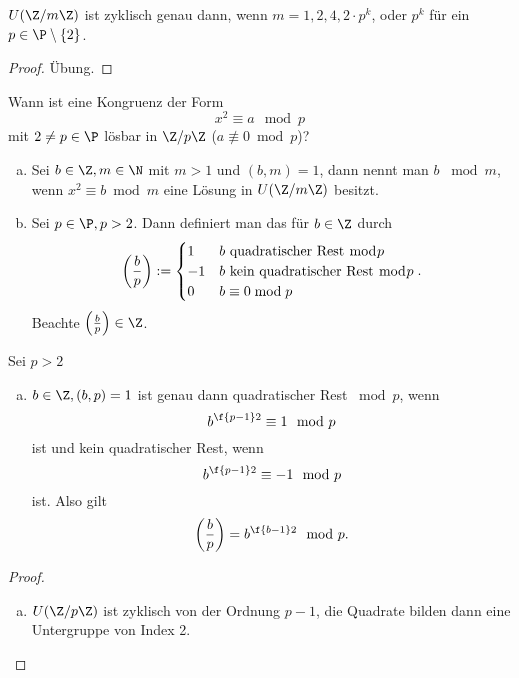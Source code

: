 \begin{kor} \label{2.12}
	$U(\Z / m\Z)$ ist zyklisch genau dann, wenn $m = 1, 2, 4, 2 \cdot p^k$, oder $p^k$ für ein $p \in \P \setminus \{2\}$.
	\begin{proof}
		Übung.
		\Exercise
	\end{proof}
\end{kor}

Wann ist eine Kongruenz der Form
\[
	x^2 \equiv a \mod p
\]
mit $2 \neq p \in \P$ lösbar in $\Z / p\Z$ ($a \not\equiv 0 \bmod p$)?

\begin{df} \label{2.13}
	\begin{enumerate}[a)]
		\item
		Sei $b \in \Z, m \in \N$ mit $m > 1$ und $(b, m) = 1$, dann nennt man $b$  $\bmod m$, wenn $x^2 \equiv b \bmod m$ eine Lösung in $U(\Z / m\Z)$ besitzt.
		\item
			Sei $p \in \P, p > 2$.
			Dann definiert man das  für $b \in \Z$ durch
			\[
				\left( \frac{b}{p} \right) := \begin{cases}
					1 & \text{$b$ quadratischer Rest $\bmod p$} \\
					-1 & \text{$b$ kein quadratischer Rest $\bmod p$} \\
					0 & \text{$b \equiv 0 \bmod p$}
				\end{cases}.
			\]
			Beachte $\legsym bp \in \Z$.
	\end{enumerate}
\end{df}

\begin{lem}
	Sei $p > 2$
	\begin{enumerate}[a)]
		\item
			$b \in \Z, (b, p) = 1$ ist genau dann quadratischer Rest $\bmod p$, wenn
			\[
				b^{\f {p-1}2} \equiv 1 \mod p
			\]
			ist und kein quadratischer Rest, wenn
			\[
				b^{\f {p-1}2} \equiv -1 \mod p
			\]
			ist.
			Also gilt
			\[
				\legsym bp = b^{\f {b-1}2} \mod p.
			\]
	\end{enumerate}
	\begin{proof}
		\begin{enumerate}[a)]
			\item
				$U(\Z / p\Z)$ ist zyklisch von der Ordnung $p - 1$, die Quadrate bilden dann eine Untergruppe von Index 2.
		\end{enumerate}
	\end{proof}
\end{lem}








